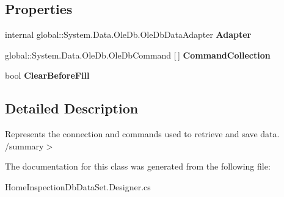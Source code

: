 \subsection*{Properties}
\begin{DoxyCompactItemize}
\item 
\mbox{\label{class_a_f_h___scheduler_1_1_home_inspection_db_data_set_table_adapters_1_1_inspection___schedule_table_adapter_a8f3c09a224fa3ccb4a1c050507b7c790}} 
internal global\+::\+System.\+Data.\+Ole\+Db.\+Ole\+Db\+Data\+Adapter {\bfseries Adapter}\hspace{0.3cm}{\ttfamily  [get]}
\item 
\mbox{\label{class_a_f_h___scheduler_1_1_home_inspection_db_data_set_table_adapters_1_1_inspection___schedule_table_adapter_a80708b10037e74ef174dbb35c85273e0}} 
global\+::\+System.\+Data.\+Ole\+Db.\+Ole\+Db\+Command [$\,$] {\bfseries Command\+Collection}\hspace{0.3cm}{\ttfamily  [get]}
\item 
\mbox{\label{class_a_f_h___scheduler_1_1_home_inspection_db_data_set_table_adapters_1_1_inspection___schedule_table_adapter_a27edb260221a4d730dbd3f59543a1973}} 
bool {\bfseries Clear\+Before\+Fill}\hspace{0.3cm}{\ttfamily  [get, set]}
\end{DoxyCompactItemize}


\subsection{Detailed Description}
Represents the connection and commands used to retrieve and save data. /summary$>$ 

The documentation for this class was generated from the following file\+:\begin{DoxyCompactItemize}
\item 
Home\+Inspection\+Db\+Data\+Set.\+Designer.\+cs\end{DoxyCompactItemize}
